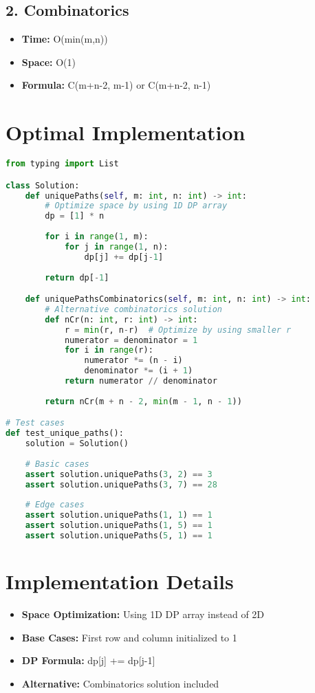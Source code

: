 \subsection*{2. Combinatorics}
\begin{itemize}
    \item \textbf{Time:} O(min(m,n))
    \item \textbf{Space:} O(1)
    \item \textbf{Formula:} C(m+n-2, m-1) or C(m+n-2, n-1)
\end{itemize}

\section*{Optimal Implementation}
\begin{fullwidth}
\begin{lstlisting}[language=Python]
from typing import List

class Solution:
    def uniquePaths(self, m: int, n: int) -> int:
        # Optimize space by using 1D DP array
        dp = [1] * n
        
        for i in range(1, m):
            for j in range(1, n):
                dp[j] += dp[j-1]
        
        return dp[-1]

    def uniquePathsCombinatorics(self, m: int, n: int) -> int:
        # Alternative combinatorics solution
        def nCr(n: int, r: int) -> int:
            r = min(r, n-r)  # Optimize by using smaller r
            numerator = denominator = 1
            for i in range(r):
                numerator *= (n - i)
                denominator *= (i + 1)
            return numerator // denominator
            
        return nCr(m + n - 2, min(m - 1, n - 1))

# Test cases
def test_unique_paths():
    solution = Solution()
    
    # Basic cases
    assert solution.uniquePaths(3, 2) == 3
    assert solution.uniquePaths(3, 7) == 28
    
    # Edge cases
    assert solution.uniquePaths(1, 1) == 1
    assert solution.uniquePaths(1, 5) == 1
    assert solution.uniquePaths(5, 1) == 1
\end{lstlisting}
\end{fullwidth}

\section*{Implementation Details}
\begin{itemize}
    \item \textbf{Space Optimization:} Using 1D DP array instead of 2D
    \item \textbf{Base Cases:} First row and column initialized to 1
    \item \textbf{DP Formula:} dp[j] += dp[j-1]
    \item \textbf{Alternative:} Combinatorics solution included
\end{itemize}

